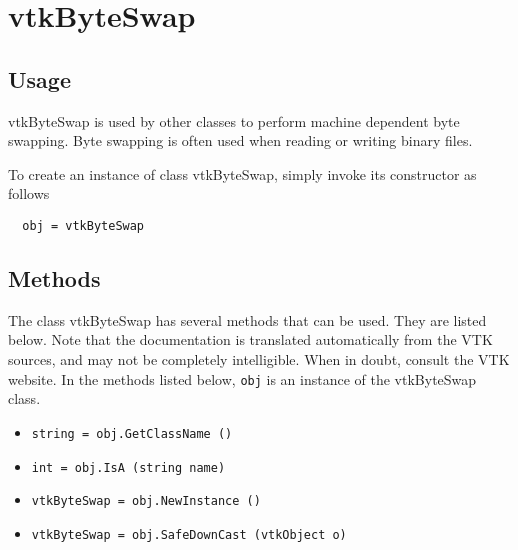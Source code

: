 \section{vtkByteSwap}

\subsection{Usage}

 vtkByteSwap is used by other classes to perform machine dependent byte
 swapping. Byte swapping is often used when reading or writing binary 
 files.

To create an instance of class vtkByteSwap, simply
invoke its constructor as follows
\begin{verbatim}
  obj = vtkByteSwap
\end{verbatim}
\subsection{Methods}

The class vtkByteSwap has several methods that can be used.
  They are listed below.
Note that the documentation is translated automatically from the VTK sources,
and may not be completely intelligible.  When in doubt, consult the VTK website.
In the methods listed below, \verb|obj| is an instance of the vtkByteSwap class.
\begin{itemize}
\item  \verb|string = obj.GetClassName ()|

\item  \verb|int = obj.IsA (string name)|

\item  \verb|vtkByteSwap = obj.NewInstance ()|

\item  \verb|vtkByteSwap = obj.SafeDownCast (vtkObject o)|

\end{itemize}
